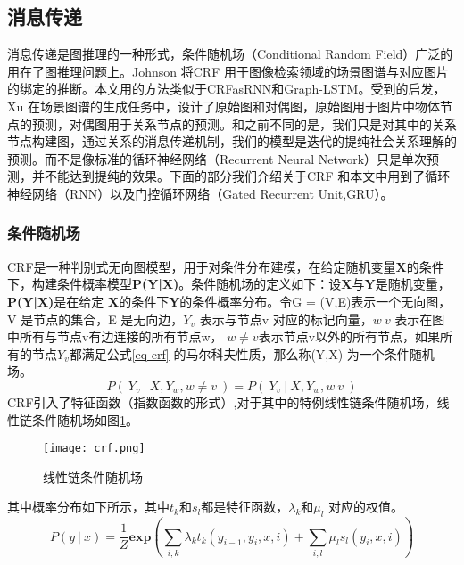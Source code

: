 
\subsection{消息传递}

消息传递是图推理的一种形式，条件随机场（Conditional Random Field）广泛的用在了图推理问题上。Johnson\cite{johnson2015image} 将CRF 用于图像检索领域的场景图谱与对应图片的绑定的推断。本文用的方法类似于CRFasRNN\cite{zheng2015conditional}和Graph-LSTM\cite{liang2016semantic}。受到\cite{xu2017scene}的启发，Xu 在场景图谱的生成任务中，设计了原始图和对偶图，原始图用于图片中物体节点的预测，对偶图用于关系节点的预测。和之前不同的是，我们只是对其中的关系节点构建图，通过关系的消息传递机制，我们的模型是迭代的提纯社会关系理解的预测。而不是像标准的循环神经网络（Recurrent Neural Network）只是单次预测，并不能达到提纯的效果。下面的部分我们介绍关于CRF 和本文中用到了循环神经网络（RNN）以及门控循环网络（Gated Recurrent Unit,GRU）。

\subsubsection{条件随机场}
CRF是一种判别式无向图模型，用于对条件分布建模，在给定随机变量\textbf{X}的条件下，构建条件概率模型\textbf{P(Y|X)}。条件随机场的定义如下：设\textbf{X}与\textbf{Y}是随机变量，\textbf{P(Y|X)}是在给定
\textbf{X}的条件下\textbf{Y}的条件概率分布。令G = (V,E)表示一个无向图，V 是节点的集合，E 是无向边，$Y_{v}$ 表示与节点v 对应的标记向量，$w~v$ 表示在图中所有与节点v有边连接的所有节点w，
$w \neq v$表示节点v以外的所有节点，如果所有的节点$Y_v$都满足公式\ref{eq-crf}  的马尔科夫性质，那么称(Y,X) 为一个条件随机场。
\begin{equation} \label{eq-crf}
    P(~Y_{v}~|~X,Y_w,w \neq v~) = P(~Y_v~|~X,Y_w,w~v~)
\end{equation}
CRF引入了特征函数（指数函数的形式）,对于其中的特例线性链条件随机场，线性链条件随机场如图\ref{fig:crf}。
\begin{figure}[htpb]
	\centering
	\texttt{[image: crf.png]}
    \caption{线性链条件随机场}
	\vspace*{-3.5mm}
	\label{fig:crf}
\end{figure}
其中概率分布如下所示，其中$t_{k}$和$s_{l}$都是特征函数，$\lambda_{k}$和$\mu_{l}$ 对应的权值。
\begin{equation}
    P(y~|~x) = \frac{1}{Z}\mathbf{exp}(\sum_{i,k}\lambda_{k}t_{k}(y_{i-1},y_{i},x,i)+\sum_{i,l}\mu_{l}s_{l}(y_{i},x,i))
\end{equation}

